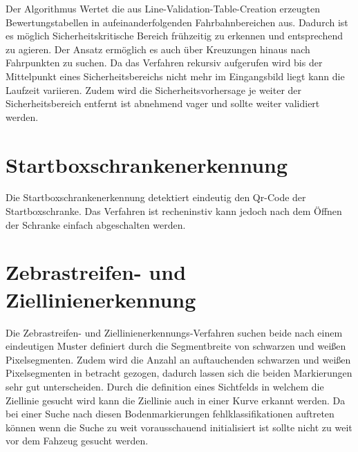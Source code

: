 Der Algorithmus Wertet die aus Line-Validation-Table-Creation erzeugten Bewertungstabellen in aufeinanderfolgenden Fahrbahnbereichen aus. Dadurch ist es möglich Sicherheitskritische Bereich frühzeitig zu erkennen und entsprechend zu agieren. Der Ansatz ermöglich es auch über Kreuzungen hinaus nach Fahrpunkten zu suchen. Da das Verfahren rekursiv aufgerufen wird bis der Mittelpunkt eines Sicherheitsbereichs nicht mehr im Eingangsbild liegt kann die Laufzeit variieren. Zudem wird die Sicherheitsvorhersage je weiter der Sicherheitsbereich entfernt ist abnehmend vager und sollte weiter validiert werden.

\section{Startboxschrankenerkennung}
\label{section:Startboxschrankenerkennung}
Die Startboxschrankenerkennung detektiert eindeutig den Qr-Code der Startboxschranke. Das Verfahren ist recheninstiv kann jedoch nach dem Öffnen der Schranke einfach abgeschalten werden.


\section{Zebrastreifen- und Ziellinienerkennung}
\label{section:Zebrastreifen- und Ziellinienerkennung}
Die Zebrastreifen- und Ziellinienerkennungs-Verfahren suchen beide nach einem eindeutigen Muster definiert durch die Segmentbreite von schwarzen und weißen Pixelsegmenten. Zudem wird die Anzahl an auftauchenden schwarzen und weißen Pixelsegmenten in betracht gezogen, dadurch lassen sich die beiden Markierungen sehr gut unterscheiden.
Durch die definition eines Sichtfelds in welchem die Ziellinie gesucht wird kann die Ziellinie auch in einer Kurve erkannt werden.
Da bei einer Suche nach diesen Bodenmarkierungen fehlklassifikationen auftreten können wenn die Suche zu weit vorausschauend initialisiert ist sollte nicht zu weit vor dem Fahzeug gesucht werden.  






